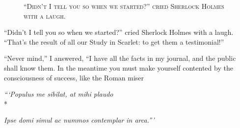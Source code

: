 \documentclass[12pt,english]{book}
\newcommand{\noun}[1]{\textsc{#1}}
\begin{document}
%
\begin{figure}[htbp]
\noindent {}

\noindent \begin{center}\noun{{}``Didn't I tell you so when we
started?'' cried Sherlock Holmes with a laugh.}\end{center}
\end{figure}
{}``Didn't I tell you so when we started?'' cried Sherlock Holmes
with a laugh. {}``That's the result of all our Study in Scarlet:
to get them a testimonial!''

{}``Never mind,'' I answered, {}``I have all the facts in my journal,
and the public shall know them. In the meantime you must make yourself
contented by the consciousness of success, like the Roman miser\mdsh{---}

\begin{center} \footnotesize

\textit{```Populus me sibilat, at mihi plaudo} \\*

\textit{Ipse domi simul ac nummos contemplar in arca.'''}

\end{center}
\end{document}
